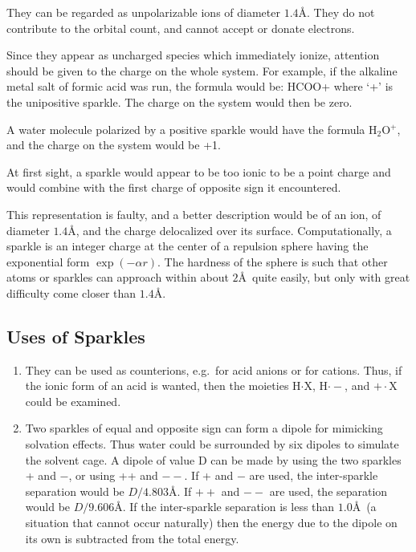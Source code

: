 They can be regarded as unpolarizable ions of diameter $1.4$\AA.   They do 
not  contribute  to  the  orbital count, and cannot accept or donate electrons.

Since they appear as uncharged species  which  immediately  ionize, attention 
should  be  given  to  the  charge  on the whole system.  For example, if the
alkaline metal salt of formic acid was run, the  formula would be: HCOO+ where
`+' is the unipositive sparkle.   The charge on the system would then be zero.

A water molecule polarized by a positive  sparkle  would  have  the formula
H$_2$O$^+$, and the charge on the system would be +1.

At first sight, a sparkle would appear to be  too  ionic  to  be  a point
charge and would combine with the first charge of opposite sign it encountered.

This representation is faulty, and a better description would be of an  ion, 
of diameter $1.4$\AA, and the charge delocalized over its surface.
Computationally, a sparkle is an integer  charge  at  the  center  of  a
repulsion  sphere  having the exponential form $\exp(-\alpha r)$.   The
hardness of the sphere is such that other atoms or sparkles can approach within
about $2$\AA\ quite easily, but only with great difficulty come closer than
$1.4$\AA.

\subsection*{Uses of Sparkles}
\begin{enumerate}
\item They can be used as counterions, e.g.\  for acid anions  or  for
cations.   Thus,  if  the ionic form of an acid is wanted, then the moieties
H$\cdot$X, H$\cdot -$, and $+\cdot$X could be examined.

\item Two sparkles of equal and opposite sign can form a  dipole  for
 mimicking solvation effects.  Thus water
could be surrounded by six dipoles to simulate the solvent cage.  A dipole of
value  D can  be made by using the two sparkles + and $-$, or using ++ and {\bf
$ --$}.  If + and $-$ are used, the inter-sparkle separation would be
$D/4.803$\AA.  If {\bf $ ++$} and {\bf $ --$} are used, the separation would be
$D/9.606$\AA.  If the inter-sparkle separation is  less than $1.0$\AA\  (a
situation that cannot occur naturally) then the energy due to the dipole on its
own is subtracted from the total energy.
\end{enumerate}
